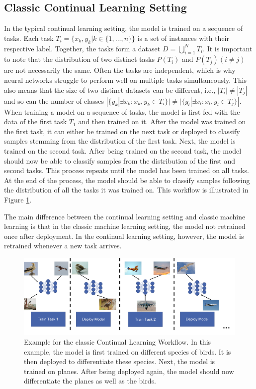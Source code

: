 \subsection{Classic Continual Learning Setting}
\label{sec:Methodology:CLSetting}
In the typical continual learning setting, the model is trained on a sequence of tasks. Each task $T_i = \{x_k,y_k | k \in \{1,\ldots,n\}\}$ is a set
of instances with their respective label. Together, the tasks form a dataset $D = \bigcup\limits_{i=1}^{N} T_i$. It is important to note that
the distribution of two distinct tasks $P(T_i)$  and $P(T_j) (i \neq j)$ are not necessarily the same. Often the tasks are independent, which is why
neural networks struggle to perform well on multiple tasks simultaneously. This also means that the size of two distinct datasets
can be different, i.e., $|T_i| \neq |T_j|$ and so can the number of classes $|\{y_k | \exists x_k: x_k,y_k \in T_i \}| \neq |\{y_l | \exists x_l: x_l,y_l
\in T_j\}|$. When training a model on a sequence of tasks, the model is first fed with the data of the first task $T_1$ and then trained on it. 
After the model was trained on the first task, it can either be trained on the next task or deployed to classify samples stemming from the
distribution of the first task. Next, the model is trained on the second task. After being trained on the second task, the model should now be able to
classify samples from the distribution of the first and second tasks. This process repeats until the model has been trained on all
tasks. At the end of the process, the model should be able to classify samples following the distribution of all the tasks it was trained on.
This workflow is illustrated in Figure \ref{fig:CLWorkflow}. \par
The main difference between the continual learning setting and classic machine learning is that in the classic machine learning setting, the model
not retrained once after deployment. In the continual learning setting, however, the model is retrained whenever a new task arrives.

\begin{figure}[ht]
    \centering
    \includegraphics[width=.9\linewidth]{images/CL_workflow.png}
    \caption[Continual learning Workflow]{Example for the classic Continual Learning Workflow. In this example, the model is first trained on different species of
    birds. It is then deployed to differentiate these species. Next, the model is trained on planes. After being deployed again, the model should now differentiate
    the planes as well as the birds.}
    \label{fig:CLWorkflow}
  \end{figure}

